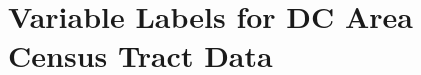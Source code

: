 \documentclass{article}
\begin{document}
\section*{Variable Labels for DC Area Census Tract Data}

\end{document}
